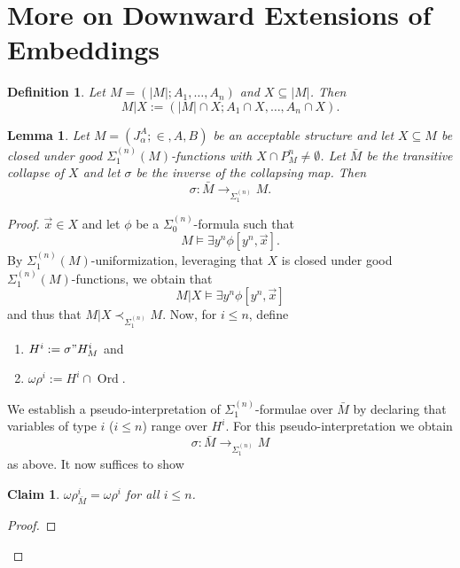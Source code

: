 \documentclass[12pt,a4paper]{article}
\theoremstyle{nicestyle}
\newtheorem{definition}{Definition}[subsection]
\newtheorem{lemma}{Lemma}[subsection]
\newtheorem{claim}{Claim}[subsection]
\newenvironment{proofblack}{\begin{proof}}
  {\renewcommand{\qedsymbol}{$\blacksquare$}\end{proof}}
\DeclareMathOperator{\ord}{Ord}
\begin{document}
    \section{More on Downward Extensions of Embeddings}
    
    \begin{definition}
      Let $M = (|M|; A_{1}, \ldots, A_{n})$ and $X \subseteq |M|$. Then
      \[
	M | X := (|M| \cap X; A_{1} \cap X, \ldots, A_{n} \cap X).
      \]
    \end{definition}

    \begin{lemma}
      Let $M = (J^{A}_{\alpha}; \in, A, B)$ be an acceptable structure
      and let $X \subseteq M$ be closed under good
      $\Sigma^{(n)}_{1}(M)$-functions with
      $X \cap P^{n}_{M} \neq \emptyset$. Let $\bar{M}$ be the
      transitive collapse of $X$ and let $\sigma$ be the inverse of
      the collapsing map. Then
      \[
	\sigma \colon \bar{M} \to_{\Sigma^{(n)}_{1}} M.
      \]
    \end{lemma}

    \begin{proof}
      $\vec{x} \in X$ and let $\phi$ be a $\Sigma^{(n)}_{0}$-formula
      such that
      \[
	M \models \exists y^{n} \phi[y^{n}, \vec{x}].
      \]
      By $\Sigma^{(n)}_{1}(M)$-uniformization, leveraging that $X$ is
      closed under good $\Sigma^{(n)}_{1}(M)$-functions, we obtain
      that
      \[
	M | X \models \exists y^{n} \phi[y^{n}, \vec{x}]
      \]
      and thus that $M | X \prec_{\Sigma^{(n)}_{1}} M$. Now, for
      $i \le n$, define
      \begin{enumerate}
      \item $H^{i} := \sigma " H^{i}_{M}$ and
      \item $\omega\rho^{i} := H^{i} \cap \ord$.
      \end{enumerate}
      We establish a pseudo-interpretation of
      $\Sigma^{(n)}_{1}$-formulae over $\bar{M}$ by declaring that
      variables of type $i$ ($i \le n$) range over $H^{i}$. For this
      pseudo-interpretation we obtain
      \[
	\sigma \colon \bar{M} \to_{\Sigma^{(n)}_{1}} M
      \]
      as above. It now suffices to show
      \begin{claim}
        $\omega\rho^{i}_{\bar{M}} = \omega\rho^{i}$ for all $i \le n$.
      \end{claim}

      \begin{proofblack}
      \end{proofblack}
    \end{proof}
\end{document}
